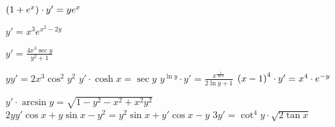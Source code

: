 \begin{multicols}{3}
\begin{enumtasks}
			\item \( \left( 1 + e^x \right) \cdot y' = y e^{x} \) 									%
			\item \( y' = x^3 e^{x^2 - 2y} \)												%
			\item \( y' = \frac{4x^3 \sec{y}}{y^2 + 1} \)									%
			\item \( yy' = 2x^3 \cos^2{y^2} \)												%
			\itemstar \( y' \cdot \cosh{x} = \sec{y} \)										%
			\itemstar \( y^{\ln{y}} \cdot y' = \frac{x^{\frac{1}{\ln{x}}}}{2\ln{y} + 1} \)	%
			\itemstar \( \left( x-1 \right)^4 \cdot y' = x^4 \cdot e^{-y} \)						%
			
		\end{enumtasks}
	\end{multicols}

	\begin{enumtasks}

		\label{firstorder:separable2}
		\itemstar \( y' \cdot \arcsin{y} = \sqrt{1 - y^2 - x^2 + x^2 y^2} \)			%
		\itemstar \( 2yy' \cos{x} + y \sin{x} - y^2 = y^2 \sin{x} + y' \cos{x} - y \)	%
		\itemstar \( 3y' = \cot^4{y} \cdot \sqrt{2\tan{x}} \)							%

	\end{enumtasks}

